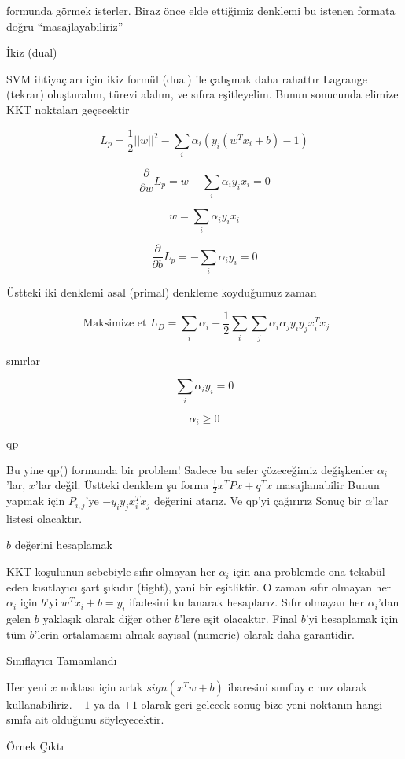 \documentclass[12pt,fleqn]{article}\usepackage{../../common}
\begin{document}
formunda görmek isterler. Biraz önce elde ettiğimiz denklemi bu istenen formata
doğru ``masajlayabiliriz''

İkiz (dual)

SVM ihtiyaçları için ikiz formül (dual) ile çalışmak daha rahattır
Lagrange (tekrar) oluşturalım, türevi alalım, ve sıfıra eşitleyelim.
Bunun sonucunda elimize KKT noktaları geçecektir

$$
L_{p} = \frac{1}{2}||w||^{2}-\sum_{i}\alpha_{i}(y_{i}(w^{T}x_{i}+b)-1)  
$$

$$
\frac{\partial}{\partial w} L_{p} = w-\sum_{i}\alpha_{i}y_{i}x_{i}=0  $$

$$
w = \sum_{i}\alpha_{i}y_{i}x_{i} 
$$

$$
\frac{\partial}{\partial b} L_{p} = -\sum_{i}\alpha_{i}y_{i}=0  
$$

Üstteki iki denklemi asal (primal) denkleme koyduğumuz zaman

$$
\textrm{ Maksimize et } L_{D}= \sum_{i}\alpha_{i}-\frac{1}{2}
\sum_{i} \sum_{j} \alpha_{i} \alpha_{j} y_{i}y_{j}x_{i}^{T}x_{j} 
$$

sınırlar

$$ \sum_{i}\alpha_{i}y_{i}=0  $$

$$ \alpha_{i} \geq 0  $$ 

qp

Bu yine qp() formunda bir problem! Sadece bu sefer çözeceğimiz değişkenler
$\alpha_i$'lar, $x$'lar değil.  Üstteki denklem şu forma
$\frac{1}{2}x^{T}Px+q^{T}x$ masajlanabilir Bunun yapmak için $P_{i,j}$'ye
$-y_{i}y_{j}x_{i}^{T}x_{j}$ değerini atarız.  Ve qp'yi çağırırız Sonuç bir
$\alpha$'lar listesi olacaktır.

$b$ değerini hesaplamak

KKT koşulunun sebebiyle sıfır olmayan her $\alpha_{i}$ için ana problemde ona
tekabül eden kısıtlayıcı şart şıkıdır (tight), yani bir eşitliktir.  O zaman
sıfır olmayan her $\alpha_{i}$ için $b$'yi $w^{T}x_{i}+b = y_{i}$ ifadesini
kullanarak hesaplarız.  Sıfır olmayan her $\alpha_{i}$'dan gelen $b$ yaklaşık
olarak diğer other $b$'lere eşit olacaktır. Final $b$'yi hesaplamak için tüm
$b$'lerin ortalamasını almak sayısal (numeric) olarak daha garantidir.

Sınıflayıcı Tamamlandı

Her yeni $x$ noktası için artık $sign(x^{T}w+b)$ ibaresini sınıflayıcımız olarak
kullanabiliriz. $-1$ ya da $+1$ olarak geri gelecek sonuç bize yeni noktanın
hangi sınıfa ait olduğunu söyleyecektir.

Örnek Çıktı
\end{document}
